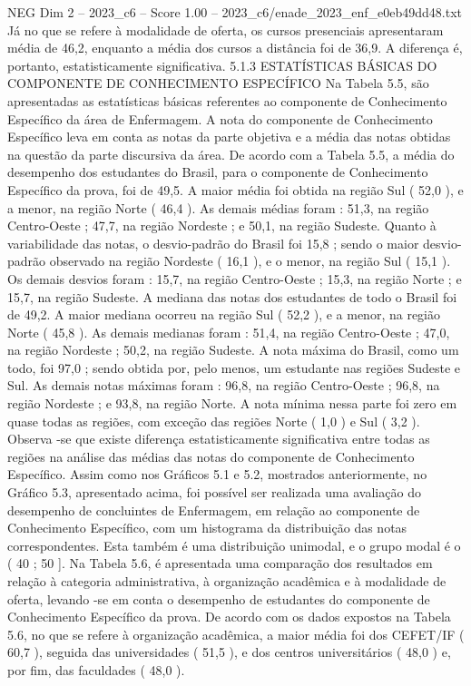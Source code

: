 \begin{textsample}{NEG Dim 2 – 2023\_c6 – Score 1.00 – 2023\_c6/enade\_2023\_enf\_e0eb49dd48.txt}
Já no que se refere à modalidade de oferta, os cursos presenciais apresentaram média de 46,2, enquanto a média dos cursos a distância foi de 36,9.
A diferença é, portanto, estatisticamente significativa. 5.1.3 ESTATÍSTICAS BÁSICAS DO COMPONENTE DE CONHECIMENTO ESPECÍFICO Na Tabela 5.5, são apresentadas as estatísticas básicas referentes ao componente de Conhecimento Específico da área de Enfermagem.
A nota do componente de Conhecimento Específico leva em conta as notas da parte objetiva e a média das notas obtidas na questão da parte discursiva da área.
De acordo com a Tabela 5.5, a média do desempenho dos estudantes do Brasil, para o componente de Conhecimento Específico da prova, foi de 49,5.
A maior média foi obtida na região Sul ( 52,0 ), e a menor, na região Norte ( 46,4 ).
As demais médias foram : 51,3, na região Centro-Oeste ; 47,7, na região Nordeste ; e 50,1, na região Sudeste.
Quanto à variabilidade das notas, o desvio-padrão do Brasil foi 15,8 ; sendo o maior desvio-padrão observado na região Nordeste ( 16,1 ), e o menor, na região Sul ( 15,1 ).
Os demais desvios foram : 15,7, na região Centro-Oeste ; 15,3, na região Norte ; e 15,7, na região Sudeste.
A mediana das notas dos estudantes de todo o Brasil foi de 49,2.
A maior mediana ocorreu na região Sul ( 52,2 ), e a menor, na região Norte ( 45,8 ).
As demais medianas foram : 51,4, na região Centro-Oeste ; 47,0, na região Nordeste ; 50,2, na região Sudeste.
A nota máxima do Brasil, como um todo, foi 97,0 ; sendo obtida por, pelo menos, um estudante nas regiões Sudeste e Sul.
As demais notas máximas foram : 96,8, na região Centro-Oeste ; 96,8, na região Nordeste ; e 93,8, na região Norte.
A nota mínima nessa parte foi zero em quase todas as regiões, com exceção das regiões Norte ( 1,0 ) e Sul ( 3,2 ).
Observa -se que existe diferença estatisticamente significativa entre todas as regiões na análise das médias das notas do componente de Conhecimento Específico.
Assim como nos Gráficos 5.1 e 5.2, mostrados anteriormente, no Gráfico 5.3, apresentado acima, foi possível ser realizada uma avaliação do desempenho de concluintes de Enfermagem, em relação ao componente de Conhecimento Específico, com um histograma da distribuição das notas correspondentes.
Esta também é uma distribuição unimodal, e o grupo modal é o ( 40 ; 50 ].
Na Tabela 5.6, é apresentada uma comparação dos resultados em relação à categoria administrativa, à organização acadêmica e à modalidade de oferta, levando -se em conta o desempenho de estudantes do componente de Conhecimento Específico da prova.
De acordo com os dados expostos na Tabela 5.6, no que se refere à organização acadêmica, a maior média foi dos CEFET/IF ( 60,7 ), seguida das universidades ( 51,5 ), e dos centros universitários ( 48,0 ) e, por fim, das faculdades ( 48,0 ).

\end{textsample}
